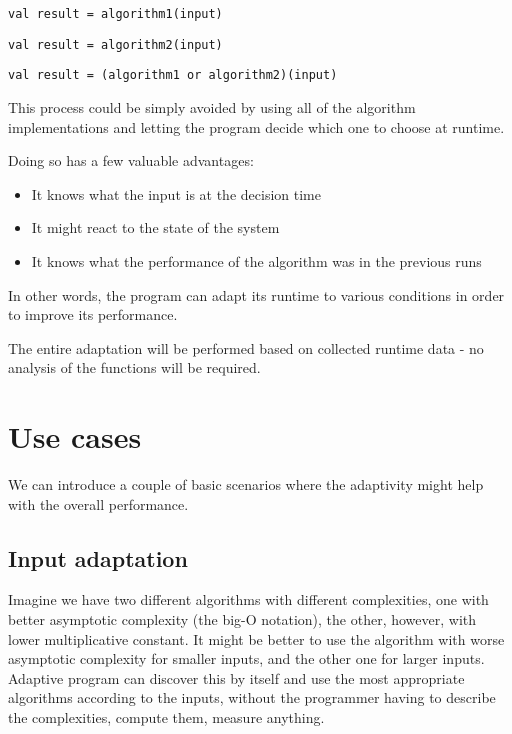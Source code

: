 \lstset{style=Scala}
\begin{lstlisting}
val result = algorithm1(input)
\end{lstlisting}

\lstset{style=Scala}
\begin{lstlisting}
val result = algorithm2(input)
\end{lstlisting}

\lstset{style=Scala}
\begin{lstlisting}
val result = (algorithm1 or algorithm2)(input)
\end{lstlisting}

This process could be simply avoided by using all of the algorithm implementations and letting the program decide which one to choose at runtime.

Doing so has a few valuable advantages:
\begin{itemize}
	\item It knows what the input is at the decision time
	\item It might react to the state of the system
	\item It knows what the performance of the algorithm was in the previous runs
\end{itemize}

In other words, the program can adapt its runtime to various conditions in order to improve its performance.

The entire adaptation will be performed based on collected runtime data - no analysis of the functions will be required.

\section{Use cases}

We can introduce a couple of basic scenarios where the adaptivity might help with the overall performance.

\subsection{Input adaptation}

Imagine we have two different algorithms with different complexities, one with better asymptotic complexity (the big-O notation), the other, however, with lower multiplicative constant. It might be better to use the algorithm with worse asymptotic complexity for smaller inputs, and the other one for larger inputs. Adaptive program can discover this by itself and use the most appropriate algorithms according to the inputs, without the programmer having to describe the complexities, compute them, measure anything.

